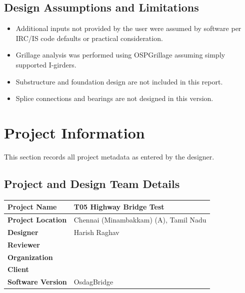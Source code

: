 \documentclass[12pt,a4paper]{report}
\numberwithin{table}{chapter}
\numberwithin{figure}{chapter}
\begin{document}
\section*{Design Assumptions and Limitations}
\label{sec:assumptions}

\begin{itemize}
\item Additional inputs not provided by the user were assumed by software per IRC/IS code defaults or practical consideration.
\item Grillage analysis was performed using OSPGrillage assuming simply supported I-girders.
\item Substructure and foundation design are not included in this report.
\item Splice connections and bearings are not designed in this version.
\end{itemize}

\titleformat{\chapter}[block]{\normalfont\Large\bfseries\centering}{\thechapter}{1em}{}
\titlespacing*{\chapter}{0pt}{-30pt}{10pt}


\chapter{Project Information}

This section records all project metadata as entered by the designer.

\section{Project and Design Team Details}
\label{sec:project-details}

\begin{tabular}{|L{5.5cm}|L{8.5cm}|}
\hline
\textbf{Project Name} & T05 Highway Bridge Test \\
\hline
\textbf{Project Location} & Chennai (Minambakkam) (A), Tamil Nadu \\
\hline
\textbf{Designer} & Harish Raghav \\
\hline
\textbf{Reviewer} &  \\
\hline
\textbf{Organization} &  \\
\hline
\textbf{Client} &  \\
\hline
\textbf{Software Version} & OsdagBridge \\
\hline
\end{tabular}
\end{document}
